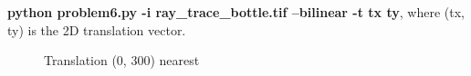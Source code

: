 \textbf{python problem6.py -i ray\_trace\_bottle.tif --bilinear -t tx ty}, where (tx, ty) is the 2D translation vector.

\begin{figure}[!htb]\centering
    \begin{minipage}{0.6\textwidth}
        \caption{\small{Translation (0, 300) nearest}}
    \end{minipage}
\end{figure}

